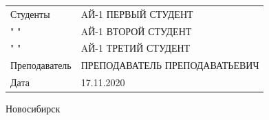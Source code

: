 \documentclass[12pt, a4paper]{report}
\begin{document}
\begin{center}
\begin{minipage}{0.3 \textwidth}
\end{minipage}%
\hfill
\begin{minipage}{0.7 \textwidth}

\begin{flushleft}
\begin{tabular}{ll}

\medskip
Студенты & AЙ-1 ПЕРВЫЙ СТУДЕНТ \\

\medskip
" " & AЙ-1 ВТОРОЙ СТУДЕНТ \\

\medskip
" " & AЙ-1 ТРЕТИЙ СТУДЕНТ \\

\medskip
Преподаватель & ПРЕПОДАВАТЕЛЬ ПРЕПОДАВАТЬЕВИЧ \\

\medskip
Дата & 17.11.2020

\end{tabular}
\end{flushleft}

\end{minipage}%

\begin{Large}

\bigskip
\bigskip
\bigskip
\bigskip
\bigskip
\bigskip
\bigskip
\bigskip

Новосибирск

\end{Large}

\end{center}
\end{document}
